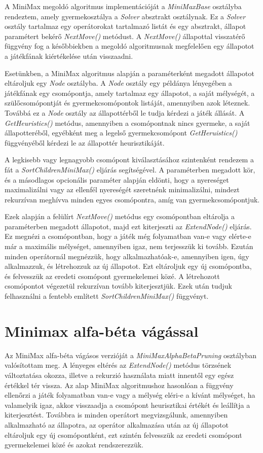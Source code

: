 \documentclass[
]{thesis-ekf}
\theoremstyle{definition}
\theoremstyle{remark}
\begin{document}
A MiniMax megoldó algoritmus implementációját a \emph{MiniMaxBase} osztályba rendeztem, amely gyermekosztálya a \emph{Solver} absztrakt osztálynak. Ez a \emph{Solver} osztály tartalmaz egy operátorokat tartalmazó listát és egy absztrakt, állapot paramétert bekérő \emph{NextMove()} metódust. A \emph{NextMove()} állapottal visszatérő függvény fog a későbbiekben a megoldó algoritmusnak megfelelően egy állapotot a játékfának kiértékelése után visszaadni.

Esetünkben, a MiniMax algoritmus alapján a paraméterként megadott állapotot eltároljuk egy \emph{Node} osztályba. A \emph{Node} osztály egy példánya lényegében a játékfának egy csomópontja, amely tartalmaz egy állapotot, a saját mélységét, a szülőcsomópontját és gyermekcsomópontok listáját, amennyiben azok léteznek. Továbbá ez a \emph{Node} osztály az állapottérből le tudja kérdezi a játék állását. A \emph{GetHeuristics()} metódus, amennyiben a csomópontnak nincs gyermeke, a saját állapotteréből, egyébként meg a legelső gyermekcsomópont \emph{GetHeruistics()} függvényéből kérdezi le az állapottér heurisztikáját. 

A legkisebb vagy legnagyobb csomópont kiválasztásához szintenként rendezem a fát a \emph{SortChildrenMiniMax()} eljárás segítségével. A paraméterben megadott kör, és a másodlagos opcionális paraméter alapján eldönti, hogy a nyereséget maximalizálni vagy  az ellenfél nyereségét szeretnénk minimalizálni, mindezt rekurzívan meghívva minden egyes csomópontra, amíg van gyermekcsomópontjuk.

Ezek alapján a felülírt \emph{NextMove()} metódus egy csomópontban eltárolja a paraméterben megadott állapotot, majd ezt kiterjeszti az \emph{ExtendNode()} eljárás. Ez megnézi a csomópontban, hogy a játék még folyamatban van-e vagy elérte-e már a maximális mélységet, amennyiben igaz, nem terjesszük ki tovább. Ezután minden operátornál megnézzük, hogy alkalmazhatóak-e, amennyiben igen, úgy alkalmazzuk, és létrehozzuk az új állapotot. Ezt eltároljuk egy új csomópontba, és felvesszük az eredeti csomópont gyermekelemei közé. A létrehozott csomópontot végezetül rekurzívan tovább kiterjesztjük. Ezek után tudjuk felhasználni a fentebb említett \emph{SortChildrenMiniMax()} függvényt.

\section{Minimax alfa-béta vágással} \label{minimaxalphabeta}

Az MiniMax alfa-béta vágásos verzióját a \emph{MiniMaxAlphaBetaPruning} osztályban valósítottam meg. A lényeges eltérés az \emph{ExtendNode()} metódus törzsének változtatása okozza, illetve a rekurzió használata miatt innentől egy egész értékkel tér vissza. Az alap MiniMax algoritmushoz hasonlóan a függvény ellenőrzi a játék folyamatban van-e vagy a mélység eléri-e a kívánt mélységet, ha valamelyik igaz, akkor visszaadja a csomópont heurisztikai értékét és leállítja a kiterjesztést. Továbbra is minden operátort megvizsgálunk, amennyiben alkalmazható az állapotra, az operátor alkalmazása után az új állapotot eltároljuk egy új csomópontként, ezt szintén felvesszük az eredeti csomópont gyermekelemei közé és azokat rendszerezzük.
\end{document}
